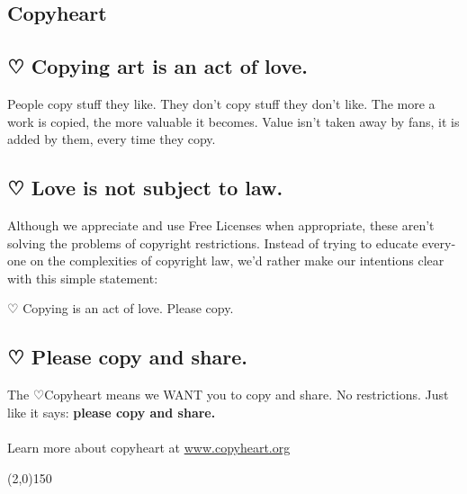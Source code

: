 \newpage
\begin{english}
\section*{Copyheart}

\subsection*{ {\dejavu ♡} Copying art is an act of love.}

People copy stuff they like. They don’t copy stuff they don’t like. The more a work is copied, the more valuable it becomes. Value isn’t taken away by fans, it is added by them, every time they copy.

\subsection*{ {\dejavu ♡} Love is not subject to law.}

Although we appreciate and use Free Licenses when appropriate, these aren’t solving the problems of copyright restrictions. Instead of trying to educate everyone on the complexities of copyright law, we’d rather make our intentions clear with this simple statement:

\begin{center} \begin{framed}
   {\dejavu ♡} Copying is an act of love. Please copy.
\end{framed} \end{center}

\subsection*{ {\dejavu ♡} Please copy and share.}

The {\dejavu ♡}Copyheart means we WANT you to copy and share. No restrictions. Just like it says: \textbf{please copy and share.}\\
 \\
Learn more about copyheart at \mbox{\url{www.copyheart.org}}
\begin{center}
\line(2,0){150}
\end{center}
\end{english}
